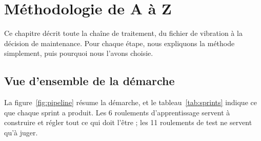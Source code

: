 \chapter{Méthodologie de A à Z}

\chapintro
Ce chapitre décrit toute la chaîne de traitement, du fichier de vibration à la décision de maintenance. Pour chaque étape, nous expliquons la méthode simplement, puis pourquoi nous l'avons choisie.

\section{Vue d'ensemble de la démarche}

La figure~\ref{fig:pipeline} résume la démarche, et le tableau~\ref{tab:sprints} indique ce que chaque sprint a produit. Les 6 roulements d'apprentissage servent à construire et régler tout ce qui doit l'être ; les 11 roulements de test ne servent qu'à juger.


